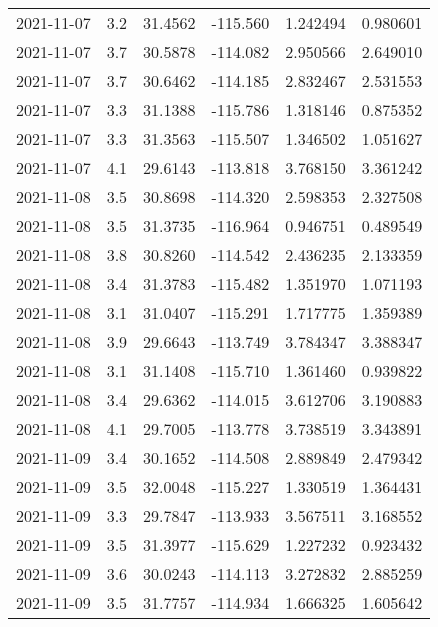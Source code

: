 \begin{tabular}{lrrrrr}
2021-11-07 &       3.2 &  31.4562 &  -115.560 &         1.242494 &         0.980601 \\
2021-11-07 &       3.7 &  30.5878 &  -114.082 &         2.950566 &         2.649010 \\
2021-11-07 &       3.7 &  30.6462 &  -114.185 &         2.832467 &         2.531553 \\
2021-11-07 &       3.3 &  31.1388 &  -115.786 &         1.318146 &         0.875352 \\
2021-11-07 &       3.3 &  31.3563 &  -115.507 &         1.346502 &         1.051627 \\
2021-11-07 &       4.1 &  29.6143 &  -113.818 &         3.768150 &         3.361242 \\
2021-11-08 &       3.5 &  30.8698 &  -114.320 &         2.598353 &         2.327508 \\
2021-11-08 &       3.5 &  31.3735 &  -116.964 &         0.946751 &         0.489549 \\
2021-11-08 &       3.8 &  30.8260 &  -114.542 &         2.436235 &         2.133359 \\
2021-11-08 &       3.4 &  31.3783 &  -115.482 &         1.351970 &         1.071193 \\
2021-11-08 &       3.1 &  31.0407 &  -115.291 &         1.717775 &         1.359389 \\
2021-11-08 &       3.9 &  29.6643 &  -113.749 &         3.784347 &         3.388347 \\
2021-11-08 &       3.1 &  31.1408 &  -115.710 &         1.361460 &         0.939822 \\
2021-11-08 &       3.4 &  29.6362 &  -114.015 &         3.612706 &         3.190883 \\
2021-11-08 &       4.1 &  29.7005 &  -113.778 &         3.738519 &         3.343891 \\
2021-11-09 &       3.4 &  30.1652 &  -114.508 &         2.889849 &         2.479342 \\
2021-11-09 &       3.5 &  32.0048 &  -115.227 &         1.330519 &         1.364431 \\
2021-11-09 &       3.3 &  29.7847 &  -113.933 &         3.567511 &         3.168552 \\
2021-11-09 &       3.5 &  31.3977 &  -115.629 &         1.227232 &         0.923432 \\
2021-11-09 &       3.6 &  30.0243 &  -114.113 &         3.272832 &         2.885259 \\
2021-11-09 &       3.5 &  31.7757 &  -114.934 &         1.666325 &         1.605642 \\

\end{tabular}
